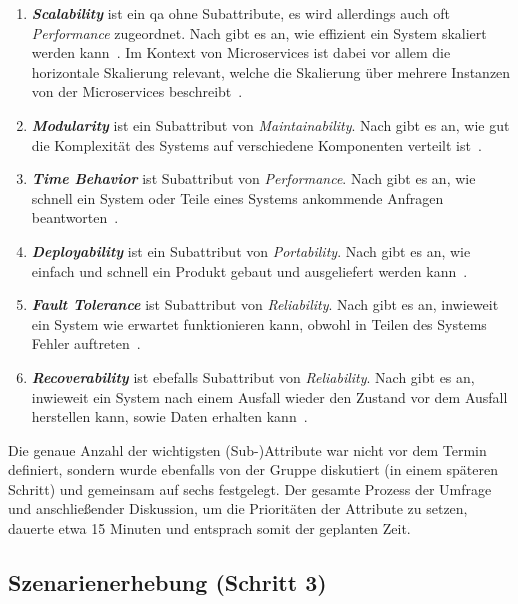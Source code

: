 \begin{enumerate}
	\item \textbf{\emph{Scalability}} ist ein \gls{qa} ohne Subattribute, es wird allerdings auch oft \emph{Performance} zugeordnet. Nach  gibt es an, wie effizient ein System skaliert werden kann~\cite{koch-scalability-1}. Im Kontext von Microservices ist dabei vor allem die horizontale Skalierung relevant, welche die Skalierung über mehrere Instanzen von der Microservices beschreibt~\cite{koch-scalability-2}.
	\item \textbf{\emph{Modularity}} ist ein Subattribut von \emph{Maintainability}. Nach  gibt es an, wie gut die Komplexität des Systems auf verschiedene Komponenten verteilt ist~\cite{ISO-25010}.
	\item \textbf{\emph{Time Behavior}} ist Subattribut von \emph{Performance}. Nach  gibt es an, wie schnell ein System oder Teile eines Systems ankommende Anfragen beantworten~\cite{ISO-25010,koch-time-behavior-1,koch-time-behavior-2}.
	\item \textbf{\emph{Deployability}} ist ein Subattribut von \emph{Portability}. Nach  gibt es an, wie einfach und schnell ein Produkt gebaut und ausgeliefert werden kann~\cite{koch-scalability-1,koch-deployability}.
	\item \textbf{\emph{Fault Tolerance}} ist Subattribut von \emph{Reliability}. Nach  gibt es an, inwieweit ein System wie erwartet funktionieren kann, obwohl in Teilen des Systems Fehler auf\-tre\-ten~\cite{ISO-25010,koch-fault-tolerance}.
	\item \textbf{\emph{Recoverability}} ist ebefalls Subattribut von \emph{Reliability}. Nach  gibt es an, inwieweit ein System nach einem Ausfall wieder den Zustand vor dem Ausfall herstellen kann, sowie Daten erhalten kann~\cite{ISO-25010}.
\end{enumerate}
Die genaue Anzahl der wichtigsten (Sub-)Attribute war nicht vor dem Termin definiert, sondern wurde ebenfalls von der Gruppe diskutiert (in einem späteren Schritt) und gemeinsam auf sechs festgelegt.
Der gesamte Prozess der Umfrage und anschließender Diskussion, um die Prioritäten der Attribute zu setzen, dauerte etwa 15 Minuten und entsprach somit der geplanten Zeit.

\subsection{Szenarienerhebung (Schritt 3)}

